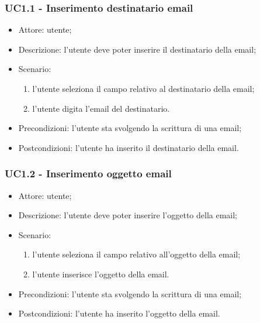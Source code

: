     \subsubsection{UC1.1 - Inserimento destinatario email}
    \begin{itemize}
        \item Attore: utente;
        \item Descrizione: l'utente deve poter inserire il destinatario della email;
        \item Scenario:
        \begin{enumerate}
        \item l'utente seleziona il campo relativo al destinatario della email;
        \item l'utente digita l'email del destinatario.
        \end{enumerate}
        \item Precondizioni: l'utente sta svolgendo la scrittura di una email;
        \item Postcondizioni: l'utente ha inserito il destinatario della email.
    \end{itemize}

    \subsubsection{UC1.2 - Inserimento oggetto email}
    \begin{itemize}
        \item Attore: utente;
        \item Descrizione: l'utente deve poter inserire l'oggetto della email;
        \item Scenario:
        \begin{enumerate}
        \item l'utente seleziona il campo relativo all'oggetto della email;
        \item l'utente inserisce l'oggetto della email.
        \end{enumerate}
        \item Precondizioni: l'utente sta svolgendo la scrittura di una email;
        \item Postcondizioni: l'utente ha inserito l'oggetto della email.
    \end{itemize}
    
